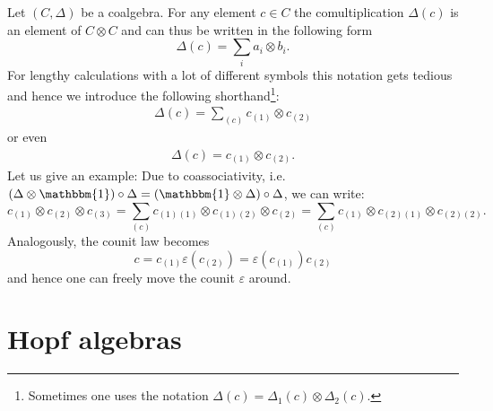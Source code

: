 
    \begin{notation}
        Let $(C, \Delta)$ be a coalgebra. For any element $c\in C$ the comultiplication $\Delta(c)$ is an element of $C\otimes C$ and can thus be written in the following form \[\Delta(c) = \sum_ia_i\otimes b_i.\] For lengthy calculations with a lot of different symbols this notation gets tedious and hence we introduce the following shorthand\footnote{Sometimes one uses the notation $\Delta(c) = \Delta_1(c)\otimes\Delta_2(c)$.}:
        \begin{gather}
            \Delta(c) = \sum_{(c)}c_{(1)}\otimes c_{(2)}
        \end{gather}
        or even
        \begin{gather}
            \Delta(c) = c_{(1)}\otimes c_{(2)}.
        \end{gather}
        Let us give an example: Due to coassociativity, i.e. $(\Delta\otimes\mathbbm{1})\circ\Delta = (\mathbbm{1}\otimes\Delta)\circ\Delta$, we can write: \[c_{(1)}\otimes c_{(2)}\otimes c_{(3)} = \sum_{(c)} c_{(1)(1)}\otimes c_{(1)(2)}\otimes c_{(2)} = \sum_{(c)} c_{(1)}\otimes c_{(2)(1)}\otimes c_{(2)(2)}.\] Analogously, the counit law becomes \[c = c_{(1)}\varepsilon(c_{(2)}) = \varepsilon(c_{(1)})c_{(2)}\] and hence one can freely move the counit $\varepsilon$ around.
    \end{notation}

\section{Hopf algebras}

